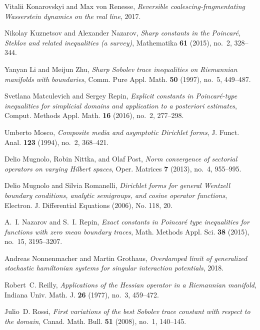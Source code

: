 \documentclass[a4paper]{article}
\theoremstyle{definition}
\numberwithin{equation}{section}
\begin{document}
\begin{thebibliography}{10}
Vitalii Konarovskyi and Max von Renesse, \emph{Reversible
  coalescing-fragmentating {W}asserstein dynamics on the real line}, 2017.

Nikolay Kuznetsov and Alexander Nazarov, \emph{Sharp constants in the
  {P}oincar\'{e}, {S}teklov and related inequalities (a survey)}, Mathematika
  \textbf{61} (2015), no.~2, 328--344. 

Yanyan Li and Meijun Zhu, \emph{Sharp {S}obolev trace inequalities on
  {R}iemannian manifolds with boundaries}, Comm. Pure Appl. Math. \textbf{50}
  (1997), no.~5, 449--487. 

Svetlana Matculevich and Sergey Repin, \emph{Explicit constants in
  {P}oincar\'{e}-type inequalities for simplicial domains and application to a
  posteriori estimates}, Comput. Methods Appl. Math. \textbf{16} (2016), no.~2,
  277--298. 

Umberto Mosco, \emph{Composite media and asymptotic {D}irichlet forms}, J.
  Funct. Anal. \textbf{123} (1994), no.~2, 368--421. 

Delio Mugnolo, Robin Nittka, and Olaf Post, \emph{Norm convergence of sectorial
  operators on varying {H}ilbert spaces}, Oper. Matrices \textbf{7} (2013),
  no.~4, 955--995. 

Delio Mugnolo and Silvia Romanelli, \emph{Dirichlet forms for general
  {W}entzell boundary conditions, analytic semigroups, and cosine operator
  functions}, Electron. J. Differential Equations (2006), No. 118, 20.

A.~I. Nazarov and S.~I. Repin, \emph{Exact constants in {P}oincar\'{e} type
  inequalities for functions with zero mean boundary traces}, Math. Methods
  Appl. Sci. \textbf{38} (2015), no.~15, 3195--3207. 

Andreas Nonnenmacher and Martin Grothaus, \emph{Overdamped limit of generalized
  stochastic hamiltonian systems for singular interaction potentials}, 2018.

Robert~C. Reilly, \emph{Applications of the {H}essian operator in a
  {R}iemannian manifold}, Indiana Univ. Math. J. \textbf{26} (1977), no.~3,
  459--472. 

Julio~D. Rossi, \emph{First variations of the best {S}obolev trace constant
  with respect to the domain}, Canad. Math. Bull. \textbf{51} (2008), no.~1,
  140--145. 


\end{thebibliography}
\end{document}
